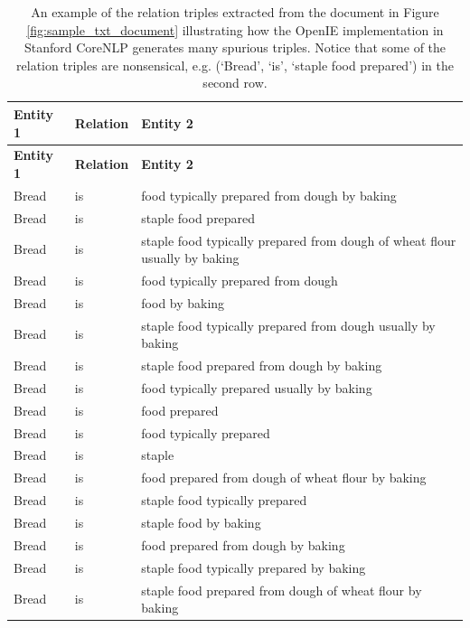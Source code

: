 \documentclass[12pt]{article}
\theoremstyle{grammarstyle}
\begin{document}
\begin{longtable}{|l|l|p{8cm}|}
    \caption{An example of the relation triples extracted from the document in Figure \ref{fig:sample_txt_document} illustrating how the OpenIE implementation in Stanford CoreNLP generates many spurious triples. Notice that some of the relation triples are nonsensical, e.g. (`Bread', `is', `staple food prepared') in the second row.}
    \label{tab:openie_example} \\
    \hline
    \textbf{Entity 1} & \textbf{Relation} & \textbf{Entity 2} \\
    \hline
    \endfirsthead

    \hline
    \textbf{Entity 1} & \textbf{Relation} & \textbf{Entity 2} \\
    \hline
    \endhead
    Bread    &	is	&    food typically prepared from dough by baking \\
    \hline
    Bread    &	is	&    staple food prepared \\
    \hline
    Bread    &	is	&    staple food typically prepared from dough of wheat flour usually by baking \\
    \hline
    Bread    &	is	&    food typically prepared from dough \\
    \hline
    Bread    &	is &    food by	baking \\
    \hline
    Bread    &	is	&    staple food typically prepared from dough usually by baking \\
    \hline
    Bread    &	is	&    staple food prepared from dough by baking \\
    \hline
    Bread    &	is	&    food typically prepared usually by baking \\
    \hline
    Bread    &	is	&    food prepared \\
    \hline
    Bread    &	is	&    food typically prepared \\
    \hline
    Bread    &	is	&    staple \\
    \hline
    Bread    &	is	&    food prepared from dough of wheat flour by baking \\
    \hline
    Bread    &	is	&    staple food typically prepared \\
    \hline
    Bread    &	is &    staple food by	baking \\
    \hline
    Bread    &	is	&    food prepared from dough by baking \\
    \hline
    Bread    &	is	&    staple food typically prepared by baking \\
    \hline
    Bread    &	is	&    staple food prepared from dough of wheat flour by baking \\

\end{longtable}
\end{document}
